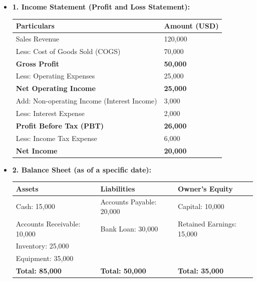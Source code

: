 \documentclass[12pt,a4paper]{book}
\begin{document}
\begin{itemize}
    \item \textbf{1. Income Statement (Profit and Loss Statement):}

    \begin{tabular}{|p{10cm}|p{5.5cm}|}
    \hline
    \textbf{Particulars} & \textbf{Amount (USD)} \\
    \hline
    Sales Revenue & 120,000 \\
    \hline
    Less: Cost of Goods Sold (COGS) & 70,000 \\
    \hline
    \textbf{Gross Profit\footnotemark[1]} & \textbf{50,000} \\
    \hline
    Less: Operating Expenses & 25,000 \\
    \hline
    \textbf{Net Operating Income\footnotemark[2]} & \textbf{25,000} \\
    \hline
    Add: Non-operating Income (Interest Income) & 3,000 \\
    \hline
    Less: Interest Expense & 2,000 \\
    \hline
    \textbf{Profit Before Tax (PBT)\footnotemark[3]} & \textbf{26,000} \\
    \hline
    Less: Income Tax Expense & 6,000 \\
    \hline
    \textbf{Net Income\footnotemark[4]} & \textbf{20,000} \\
    \hline
    \end{tabular}


    \vspace{0.5cm}
    \item \textbf{2. Balance Sheet (as of a specific date):}

    \begin{tabular}{|p{5.5cm}|p{5cm}|p{5cm}|}
    \hline
    \textbf{Assets} & \textbf{Liabilities} & \textbf{Owner’s Equity} \\
    \hline
    Cash: 15,000 & Accounts Payable: 20,000 & Capital: 10,000 \\
    Accounts Receivable: 10,000 & Bank Loan: 30,000 & Retained Earnings: 15,000 \\
    Inventory: 25,000 &  &  \\
    Equipment: 35,000 &  &  \\
    \hline
    \textbf{Total: 85,000} & \textbf{Total: 50,000} & \textbf{Total: 35,000} \\
    \hline
    \end{tabular}


\end{itemize}
\end{document}
